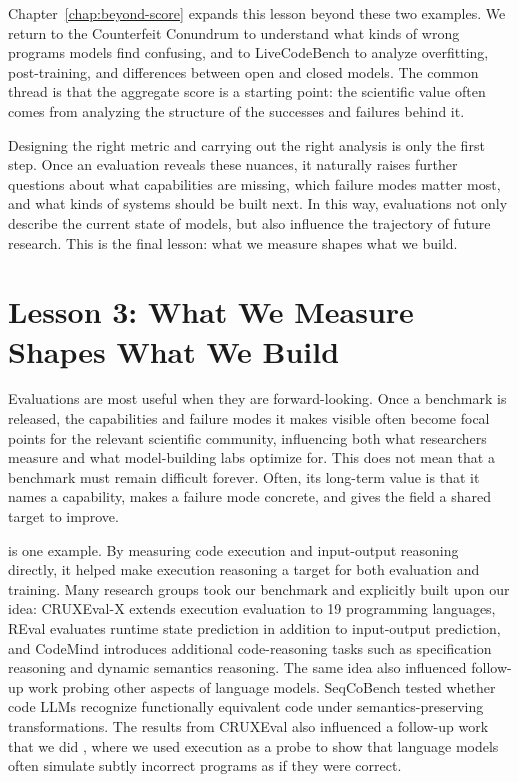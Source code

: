 Chapter~\ref{chap:beyond-score} expands this lesson beyond these two examples. We return to the
Counterfeit Conundrum to understand what kinds of wrong programs models find confusing, and to
LiveCodeBench to analyze overfitting, post-training, and differences between open and closed models.
The common thread is that the aggregate score is a starting point: the scientific value often comes
from analyzing the structure of the successes and failures behind it.

Designing the right metric and carrying out the right analysis is only the first step.
Once an evaluation reveals these nuances, it naturally raises further questions about what
capabilities are missing, which failure modes matter most, and what kinds of systems should be
built next. In this way, evaluations not only describe the current state of models, but also
influence the trajectory of future research. This is the final lesson: what we measure
shapes what we build.

\section{Lesson 3: What We Measure Shapes What We Build}

Evaluations are most useful when they are forward-looking. Once a benchmark is released, the
capabilities and failure modes it makes visible often become focal points for the relevant
scientific community, influencing both what researchers measure and what model-building labs
optimize for. This does not mean that a benchmark must remain difficult forever. Often, its
long-term value is that it names a capability, makes a failure mode concrete, and gives the field
a shared target to improve.

\benchmark{} is one example. By measuring code execution and input-output reasoning directly, it
helped make execution reasoning a target for both evaluation and training. Many research groups took our
benchmark and explicitly built upon our idea: CRUXEval-X \citep{xu2024cruxevalx} extends execution
evaluation to 19 programming languages, REval \citep{chen2024reval} evaluates runtime state
prediction in addition to input-output prediction, and CodeMind \citep{liu2024codemind} introduces
additional code-reasoning tasks such as specification reasoning and dynamic semantics reasoning.
The same idea also influenced follow-up work probing other aspects of language models. SeqCoBench \citep{maveli2025seqcobench}
tested whether code LLMs recognize functionally equivalent code under semantics-preserving
transformations. The results from CRUXEval also influenced a follow-up work that we did 
\citep{gu2024counterfeit}, where we used execution as a probe to show that language models often simulate
subtly incorrect programs as if they were correct.

